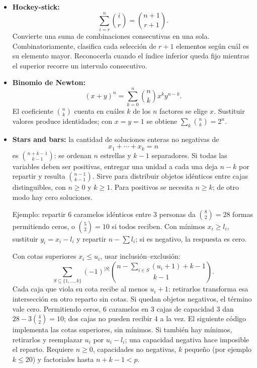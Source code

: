 \begin{itemize}
\begin{lstlisting}[style=cpp]
vector<vector<ll>> pascal_mod(int n, ll mod) {
    assert(n >= 0 && mod > 0);
    vector<vector<ll>> c(n + 1, vector<ll>(n + 1));
    for (int i = 0; i <= n; ++i) {
        c[i][0] = c[i][i] = 1 % mod;
        for (int j = 1; j < i; ++j)
            c[i][j] = mod_add(c[i-1][j-1], c[i-1][j], mod);
    }
    return c; // pascal_mod(5, 12)[5][2] == 10.
}
\end{lstlisting}

  Construcci\'on $O(N^2)$ tiempo y memoria; consulta $O(1)$. Si s\'olo hace
  falta una fila, actualizar de derecha a izquierda usa $O(N)$ memoria.
  \item \textbf{Hockey-stick:}
  \[
      \sum_{i=r}^n\binom ir=\binom{n+1}{r+1}.
  \]
  Convierte una suma de combinaciones consecutivas en una sola. Combinatoriamente,
  clasifica cada selecci\'on de $r+1$ elementos seg\'un cu\'al es su elemento
  mayor. Reconocerla cuando el \'indice inferior queda fijo mientras el superior
  recorre un intervalo consecutivo.
  \item \textbf{Binomio de Newton:}
  \[
      (x+y)^n=\sum_{k=0}^n\binom nkx^ky^{n-k}.
  \]
  El coeficiente $\binom nk$ cuenta en cu\'ales $k$ de los $n$ factores se elige
  $x$. Sustituir valores produce identidades; con $x=y=1$ se obtiene
  $\sum_k\binom nk=2^n$.
  \item \textbf{Stars and bars:} la cantidad de soluciones enteras no negativas
  de
  \[
      x_1+\cdots+x_k=n
  \]
  es $\binom{n+k-1}{k-1}$: se ordenan $n$ estrellas y $k-1$ separadores. Si
  todas las variables deben ser positivas, entregar una unidad a cada una deja
  $n-k$ por repartir y resulta $\binom{n-1}{k-1}$. Sirve para distribuir objetos
  id\'enticos entre cajas distinguibles, con $n\ge0$ y $k\ge1$.
  Para positivos se necesita $n\ge k$; de otro modo hay cero soluciones.

  Ejemplo: repartir 6 caramelos id\'enticos entre 3 personas da
  $\binom82=28$ formas permitiendo ceros, o $\binom52=10$ si todos reciben.
  Con m\'inimos $x_i\ge l_i$, sustituir $y_i=x_i-l_i$ y repartir
  $n-\sum l_i$; si es negativo, la respuesta es cero.

  Con cotas superiores $x_i\le u_i$, usar inclusi\'on--exclusi\'on:
  \[
  \sum_{S\subseteq\{1,\ldots,k\}}(-1)^{|S|}
  \binom{n-\sum_{i\in S}(u_i+1)+k-1}{k-1}.
  \]
  Cada caja que viola su cota recibe al menos $u_i+1$: retirarlos transforma
  esa intersecci\'on en otro reparto sin cotas. Si quedan objetos negativos,
  el t\'ermino vale cero. Permitiendo ceros, 6 caramelos en 3 cajas de capacidad
  3 dan $28-3\binom42=10$; dos cajas no pueden recibir 4 a la vez.
  El siguiente c\'odigo implementa las cotas superiores, sin m\'inimos. Si
  tambi\'en hay m\'inimos, retirarlos y reemplazar $u_i$ por $u_i-l_i$; una
  capacidad negativa hace imposible el reparto. Requiere $n\ge0$, capacidades
  no negativas, $k$ peque\~no (por ejemplo $k\le20$) y factoriales hasta
  $n+k-1<p$.


\end{itemize}
